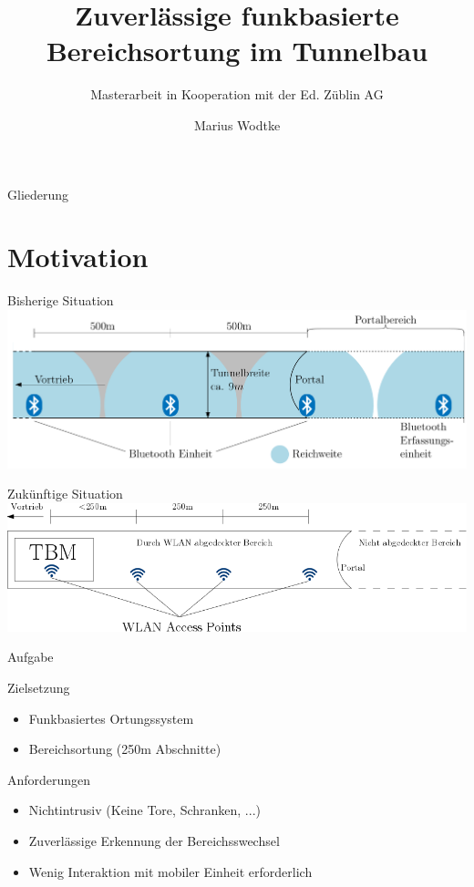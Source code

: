 \documentclass[18pt]{beamer}
\title[Funkbasierte Bereichsortung]{Zuverlässige funkbasierte
Bereichsortung im Tunnelbau}
\subtitle{Masterarbeit in Kooperation mit der Ed. Züblin AG}
\author{Marius Wodtke}
\institute{Institut für angewandte Informatik und Formale Beschreibungsverfahren}
\begin{document}

\begin{frame}
\titlepage
\end{frame}

\begin{frame}{Gliederung}
	\tableofcontents
\end{frame}

\section{Motivation}
\begin{frame}{Bisherige Situation}
	\includegraphics[width=\textwidth]{images/bisherige.png}\\
	\cite{maurer2016unterstuetzung}
\end{frame}

\begin{frame}{Zukünftige Situation}
	\includegraphics[width=\textwidth]{images/zukuenftige.png}
\end{frame}

\begin{frame}{Aufgabe}
	\begin{block}{Zielsetzung}
		\begin{itemize}
			\item Funkbasiertes Ortungssystem
			\item Bereichsortung (250m Abschnitte)
		\end{itemize}
	\end{block}


	\begin{block}{Anforderungen}
		\begin{itemize}
			\item Nichtintrusiv (Keine Tore, Schranken, ...)
			\item Zuverlässige Erkennung der Bereichsswechsel
			\item Wenig Interaktion mit mobiler Einheit erforderlich
		\end{itemize}
	\end{block}
\end{frame}
\end{document}
